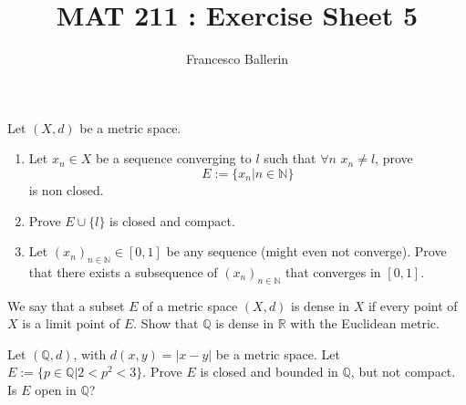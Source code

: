 \documentclass[11pt]{article}%
\title{MAT 211 : Exercise Sheet 5}
\author{Francesco Ballerin}
\date{\color{gray}{\small{francesco.ballerin@uib.no}}}
\newcommand{\R}{\mathbb{R}}
\newcommand{\Q}{\mathbb{Q}}
\begin{document}
\begin{minipage}[t]{\dimexpr \textwidth-6cm-\columnsep}
     \maketitle
\end{minipage}
\hfill\noindent{}

\vspace{50pt}

\begin{Exercise} [title=**$\dagger$]
	Let $(X,d)$ be a metric space.
\begin{enumerate}
	\item Let $x_n\in X$ be a sequence converging to $l$ such that $\forall n$ $x_n\neq l$, prove $$E:=\{x_n| n\in\mathbb{N} \}$$ is non closed.
	\item Prove $E\cup \{l\}$ is closed and compact.
	\item Let $(x_n)_{n\in\mathbb{N}}\in [0,1]$ be any sequence (might even not converge). Prove that there exists a subsequence of $(x_n)_{n\in\mathbb{N}}$ that converges in $[0,1]$.
\end{enumerate}
\end{Exercise}

\begin{Exercise}[title=*$\dagger$]
	We say that a subset $E$ of a metric space $(X,d)$ is dense in $X$ if every point of $X$ is a limit point of $E$. Show that $\Q$ is dense in $\R$ with the Euclidean metric.
\end{Exercise}

\begin{Exercise}[title=**]
Let $(\mathbb{Q},d)$, with $d(x,y)=|x-y|$ be a metric space. Let $E:=\{ p\in\mathbb{Q}| 2<p^2<3 \}$. Prove $E$ is closed and bounded in $\mathbb{Q}$, but not compact. Is $E$ open in $\mathbb{Q}$?
\end{Exercise}
\end{document}
